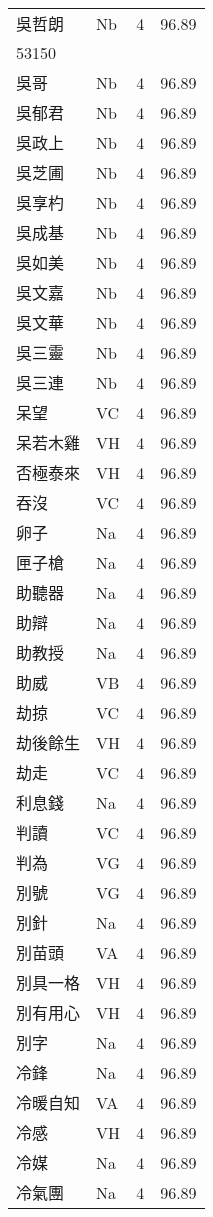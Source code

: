 \documentclass[twocolumn]{book}
\begin{document}
\begin{supertabular}{llrr}
吳哲朗 & Nb & 4 &  96.89\\
53150\\
吳哥 & Nb & 4 &  96.89\\
吳郁君 & Nb & 4 &  96.89\\
吳政上 & Nb & 4 &  96.89\\
吳芝圃 & Nb & 4 &  96.89\\
吳享杓 & Nb & 4 &  96.89\\
吳成基 & Nb & 4 &  96.89\\
吳如美 & Nb & 4 &  96.89\\
吳文嘉 & Nb & 4 &  96.89\\
吳文華 & Nb & 4 &  96.89\\
吳三靈 & Nb & 4 &  96.89\\
吳三連 & Nb & 4 &  96.89\\
呆望 & VC & 4 &  96.89\\
呆若木雞 & VH & 4 &  96.89\\
否極泰來 & VH & 4 &  96.89\\
吞沒 & VC & 4 &  96.89\\
卵子 & Na & 4 &  96.89\\
匣子槍 & Na & 4 &  96.89\\
助聽器 & Na & 4 &  96.89\\
助辯 & Na & 4 &  96.89\\
助教授 & Na & 4 &  96.89\\
助威 & VB & 4 &  96.89\\
劫掠 & VC & 4 &  96.89\\
劫後餘生 & VH & 4 &  96.89\\
劫走 & VC & 4 &  96.89\\
利息錢 & Na & 4 &  96.89\\
判讀 & VC & 4 &  96.89\\
判為 & VG & 4 &  96.89\\
別號 & VG & 4 &  96.89\\
別針 & Na & 4 &  96.89\\
別苗頭 & VA & 4 &  96.89\\
別具一格 & VH & 4 &  96.89\\
別有用心 & VH & 4 &  96.89\\
別字 & Na & 4 &  96.89\\
冷鋒 & Na & 4 &  96.89\\
冷暖自知 & VA & 4 &  96.89\\
冷感 & VH & 4 &  96.89\\
冷媒 & Na & 4 &  96.89\\
冷氣團 & Na & 4 &  96.89\\

\end{supertabular}
\end{document}
